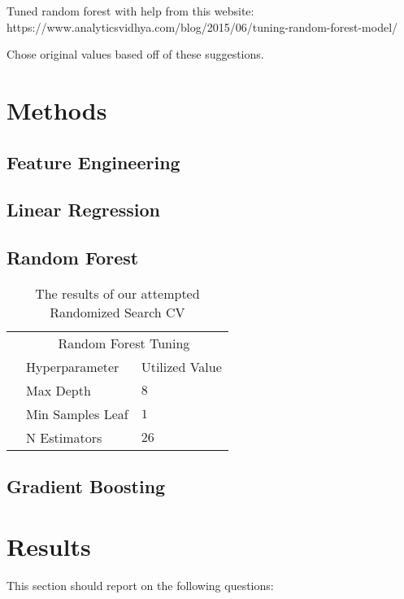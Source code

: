 \documentclass[11pt]{article}
\begin{document}
Tuned random forest with help from this website:
https://www.analyticsvidhya.com/blog/2015/06/tuning-random-forest-model/

Chose original values based off of these suggestions.

\section{Methods}
\subsection{Feature Engineering}
\subsection{Linear Regression}
\subsection{Random Forest}
  \begin{table}
  	\centering
  	\begin{tabular}{@{}lll@{}}
  		\toprule
  		&\multicolumn{2}{c}{Random Forest Tuning  } \\
  		& Hyperparameter & Utilized Value\\
  		\midrule
  		& Max Depth & $8$ \\
  		& Min Samples Leaf& $1$ \\
  		& N Estimators & $26$ \\
  		\bottomrule
  		
  	\end{tabular}
  	\caption{The results of our attempted Randomized Search CV}
  \end{table}
\subsection{Gradient Boosting}

\section{Results}
This section should report on the following questions: 
\end{document}
